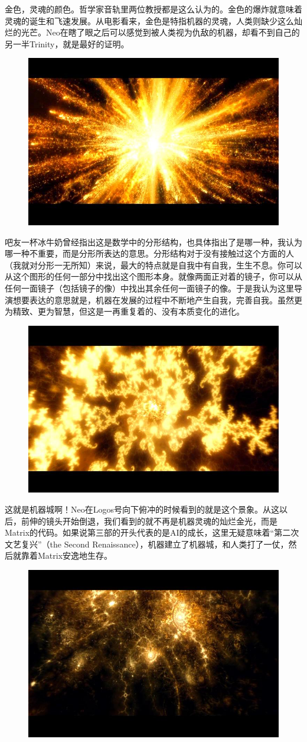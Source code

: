 \documentclass[UTF8]{ctexart}
\begin{document}
金色，灵魂的颜色。哲学家音轨里两位教授都是这么认为的。金色的爆炸就意味着灵魂的诞生和飞速发展。从电影看来，金色是特指机器的灵魂，人类则缺少这么灿烂的光芒。Neo在瞎了眼之后可以感觉到被人类视为仇敌的机器，却看不到自己的另一半Trinity，就是最好的证明。

\begin{figure}[htb]
\centering
\includegraphics[width=0.5\linewidth]{fig/9ad10e2411b6d033c8955917.jpg}
\end{figure}

吧友一杯冰牛奶曾经指出这是数学中的分形结构，也具体指出了是哪一种，我认为哪一种不重要，而是分形所表达的意思。分形结构对于没有接触过这个方面的人（我就对分形一无所知）来说，最大的特点就是自我中有自我，生生不息。你可以从这个图形的任何一部分中找出这个图形本身。就像两面正对着的镜子，你可以从任何一面镜子（包括镜子的像）中找出其余任何一面镜子的像。于是我认为这里导演想要表达的意思就是，机器在发展的过程中不断地产生自我，完善自我。虽然更为精致、更为智慧，但这是一再重复着的、没有本质变化的进化。

\begin{figure}[htb]
\centering
\includegraphics[width=0.5\linewidth]{fig/84bda8ec1f016a2762d09f11.jpg}
\end{figure}

这就是机器城啊！Neo在Logos号向下俯冲的时候看到的就是这个景象。从这以后，前伸的镜头开始倒退，我们看到的就不再是机器灵魂的灿烂金光，而是Matrix的代码。如果说第三部的开头代表的是AI的成长，这里无疑意味着“第二次文艺复兴”（the Second Renaissance），机器建立了机器城，和人类打了一仗，然后就靠着Matrix安逸地生存。

\begin{figure}[htb]
\centering
\includegraphics[width=0.5\linewidth]{fig/3c8e8b13f5356bd0f7039e11.jpg}
\end{figure}
\end{document}
